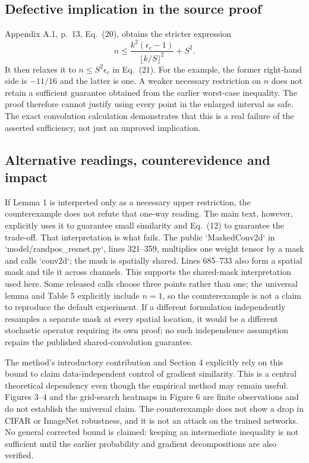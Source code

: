 \documentclass[10pt]{article}
\begin{document}
\subsection*{Defective implication in the source proof}
Appendix A.1, p. 13, Eq. (20), obtains the stricter expression \[n\le \frac{k^2(\epsilon_c-1)}{\lfloor k/S\rfloor^2}+S^2.\] It then relaxes it to \(n\le S^2\epsilon_c\) in Eq. (21). For the example, the former right-hand side is \(-11/16\) and the latter is one. A weaker necessary restriction on \(n\) does not retain a sufficient guarantee obtained from the earlier worst-case inequality. The proof therefore cannot justify using every point in the enlarged interval as safe. The exact convolution calculation demonstrates that this is a real failure of the asserted sufficiency, not just an unproved implication.\par
\subsection*{Alternative readings, counterevidence and impact}
If Lemma 1 is interpreted only as a necessary upper restriction, the counterexample does not refute that one-way reading. The main text, however, explicitly uses it to guarantee small similarity and Eq. (12) to guarantee the trade-off. That interpretation is what fails. The public `MaskedConv2d` in `model/randpos\_resnet.py`, lines 321–359, multiplies one weight tensor by a mask and calls `conv2d`; the mask is spatially shared. Lines 685–733 also form a spatial mask and tile it across channels. This supports the shared-mask interpretation used here. Some released calls choose three points rather than one; the universal lemma and Table 5 explicitly include \(n=1\), so the counterexample is not a claim to reproduce the default experiment. If a different formulation independently resamples a separate mask at every spatial location, it would be a different stochastic operator requiring its own proof; no such independence assumption repairs the published shared-convolution guarantee.\par
The method’s introductory contribution and Section 4 explicitly rely on this bound to claim data-independent control of gradient similarity. This is a central theoretical dependency even though the empirical method may remain useful. Figures 3–4 and the grid-search heatmaps in Figure 6 are finite observations and do not establish the universal claim. The counterexample does not show a drop in CIFAR or ImageNet robustness, and it is not an attack on the trained networks. No general corrected bound is claimed: keeping an intermediate inequality is not sufficient until the earlier probability and gradient decompositions are also verified.\par
\end{document}

